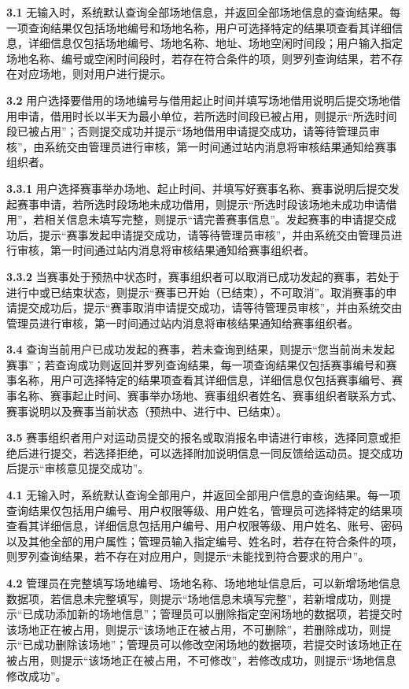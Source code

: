 \documentclass[a4paper,UTF8]{article}
\begin{document}
\textbf{3.1} 无输入时，系统默认查询全部场地信息，并返回全部场地信息的查询结果。每一项查询结果仅包括场地编号和场地名称，用户可选择特定的结果项查看其详细信息，详细信息仅包括场地编号、场地名称、地址、场地空闲时间段；用户输入指定场地名称、编号或空闲时间段时，若存在符合条件的项，则罗列查询结果，若不存在对应场地，则对用户进行提示。

\textbf{3.2} 用户选择要借用的场地编号与借用起止时间并填写场地借用说明后提交场地借用申请，借用时长以半天为最小单位，若所选时间段已被占用，则提示“所选时间段已被占用”；否则提交成功并提示“场地借用申请提交成功，请等待管理员审核”，由系统交由管理员进行审核，第一时间通过站内消息将审核结果通知给赛事组织者。

\textbf{3.3.1} 用户选择赛事举办场地、起止时间、并填写好赛事名称、赛事说明后提交发起赛事申请，若所选时段场地未成功借用，则提示“所选时段该场地未成功申请借用”，若相关信息未填写完整，则提示“请完善赛事信息”。发起赛事的申请提交成功后，提示“赛事发起申请提交成功，请等待管理员审核”，并由系统交由管理员进行审核，第一时间通过站内消息将审核结果通知给赛事组织者。

\textbf{3.3.2} 当赛事处于预热中状态时，赛事组织者可以取消已成功发起的赛事，若处于进行中或已结束状态，则提示“赛事已开始（已结束），不可取消”。取消赛事的申请提交成功后，提示“赛事取消申请提交成功，请等待管理员审核”，并由系统交由管理员进行审核，第一时间通过站内消息将审核结果通知给赛事组织者。

\textbf{3.4} 查询当前用户已成功发起的赛事，若未查询到结果，则提示“您当前尚未发起赛事”；若查询成功则返回并罗列查询结果，每一项查询结果仅包括赛事编号和赛事名称，用户可选择特定的结果项查看其详细信息，详细信息仅包括赛事编号、赛事名称、赛事起止时间、赛事举办场地、赛事组织者姓名、赛事组织者联系方式、赛事说明以及赛事当前状态（预热中、进行中、已结束）。

\textbf{3.5} 赛事组织者用户对运动员提交的报名或取消报名申请进行审核，选择同意或拒绝后进行提交，若选择拒绝，可以选择附加说明信息一同反馈给运动员。提交成功后提示“审核意见提交成功”。

\textbf{4.1} 无输入时，系统默认查询全部用户，并返回全部用户信息的查询结果。每一项查询结果仅包括用户编号、用户权限等级、用户姓名，管理员可选择特定的结果项查看其详细信息，详细信息包括用户编号、用户权限等级、用户姓名、账号、密码以及其他全部的用户属性；管理员输入指定编号、姓名时，若存在符合条件的项，则罗列查询结果，若不存在对应用户，则提示“未能找到符合要求的用户”。

\textbf{4.2} 管理员在完整填写场地编号、场地名称、场地地址信息后，可以新增场地信息数据项，若信息未完整填写，则提示“场地信息未填写完整”，若新增成功，则提示“已成功添加新的场地信息”；管理员可以删除指定空闲场地的数据项，若提交时该场地正在被占用，则提示“该场地正在被占用，不可删除”，若删除成功，则提示“已成功删除该场地”；管理员可以修改空闲场地的数据项，若提交时该场地正在被占用，则提示“该场地正在被占用，不可修改”，若修改成功，则提示“场地信息修改成功”。
\end{document}
